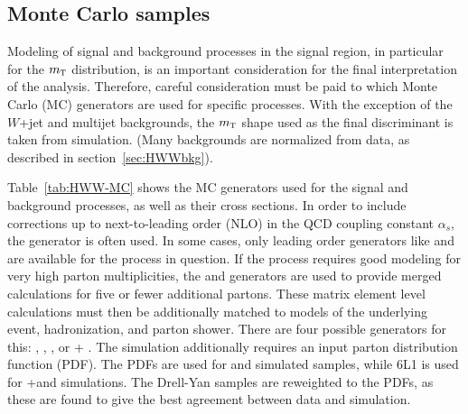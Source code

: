 \subsection{Monte Carlo samples}
\label{sec:HWWMC}

Modeling of signal and background processes in the signal region, in particular for the $m_{\textrm{\footnotesize\sc t}}$ distribution, is an important consideration for the final interpretation of the analysis. Therefore, careful consideration must be paid to which Monte Carlo (MC) generators are used for specific processes. With the exception of the $W$+jet and multijet backgrounds, the $m_{\textrm{\footnotesize\sc t}}$ shape used as the final discriminant is taken from simulation. (Many backgrounds are normalized from data, as described in section~\ref{sec:HWWbkg}).

Table~\ref{tab:HWW-MC} shows the MC generators used for the signal and background processes, as well as their cross sections. In order to include corrections up to next-to-leading order (NLO) in the QCD coupling constant $\alpha_{s}$, the \POWHEG\cite{powheg1} generator is often used. In some cases, only leading order generators like \ACERMC\cite{acermc} and \GGTOVV\cite{gg2vv} are available for the process in question. If the process requires good modeling for very high parton multiplicities, the \SHERPA\cite{sherpa} and \ALPGEN\cite{alpgen} generators are used to provide merged calculations for five or fewer additional partons. These matrix element level calculations must then be additionally matched to models of the underlying event, hadronization, and parton shower. There are four possible generators for this: \SHERPA, \cite{pythia6}, \cite{pythia8}, or \HERWIG\cite{herwig} + \JIMMY\cite{jimmy}. The simulation additionally requires an input parton distribution function (PDF). The \cite{ct10} PDFs are used for \SHERPA and \POWHEG simulated samples, while \CTEQ6L1\cite{cteq} is used for \ALPGEN+\HERWIG and \ACERMC simulations. The Drell-Yan samples are reweighted to the \MRST\cite{mrst} PDFs, as these are found to give the best agreement between data and simulation. 

